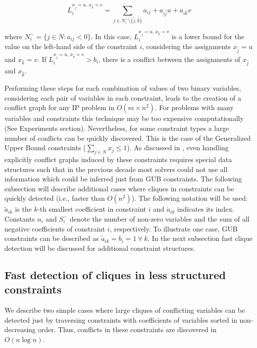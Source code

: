 \documentclass{endm}
\begin{document}
\begin{equation}\label{li}
L_{i}^{x_{\hat{j}} = u,\, x_{\hat{k}} = v}=\sum_{j\in N_{i}^{-} \setminus \{\hat{j}, \hat{k}\}}a_{ij}+a_{i\hat{j}}u+a_{i\hat{k}}v 
\end{equation}

\noindent where $N_{i}^{-} = \{j \in N : a_{ij} < 0\}$. In this case, $L_{i}^{x_{\hat{j}} = u,\, x_{\hat{k}} = v}$ is a lower bound for the value on the left-hand side  of the constraint $i$, considering the assignments $x_{\hat{j}} = u$ and $x_{\hat{k}} = v$. If $L_{i}^{x_{\hat{j}} = u,\, x_{\hat{k}} = v} > b_{i}$, there is a conflict between the assignments of $x_{\hat{j}}$ and $x_{\hat{k}}$. 

Performing these steps for each combination of values of two binary variables, considering each pair of variables in each constraint, leads to the creation of a conflict graph for any IP problem in $O(m \times n^2)$. For problems with many variables and constraints this technique may be too expensive computationally (See Experiments section). Nevertheless, for some constraint types a large number of conflicts can be quickly discovered. This is the case of the Generalized Upper Bound constraints ($\sum_{j\in N}x_j \leq 1$). As discussed in \cite{atamturk}, even handling explicitly conflict graphs induced by these constraints requires special data structures such that in the previous decade most solvers could not use all information which could be inferred just from GUB constraints. The following subsection will describe additional cases where cliques in constraints can be quickly detected (i.e., faster than $O(n^2)$). The following notation will be used: $\tilde{a}_{ik}$ is the $k$-th smallest coefficient in constraint $i$ and $\acute{a}_{ik}$ indicates its index. Constants $n_i$ and $S_i^-$ denote the number of non-zero variables and the sum of all negative coefficients of constraint $i$, respectively. To illustrate one case, GUB constraints can be described as $\tilde{a}_{ik}=b_i=1 \ \forall \ k$. In the next subsection fast clique detection will be discussed for additional constraint structures.


\subsection{Fast detection of cliques in less structured constraints}

We describe two simple cases where large cliques of conflicting variables can be detected just by traversing constraints with  coefficients of variables sorted in non-decreasing order. Thus, conflicts in these constraints are discovered in $O( n \log n)$.
\end{document}

